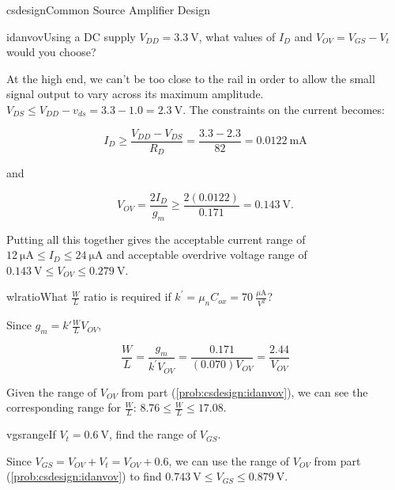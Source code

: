 \begin{mainquestion}{csdesign}{Common Source Amplifier Design}
\begin{partquestion}{idanvov}{Using a DC supply $V_{DD} = \qty{3.3}{\volt}$, what values of $I_{D}$ and $V_{OV} = V_{GS} - V_{t}$ would you choose?}
\begin{answer}
At the high end, we can't be too close to the rail in order to allow the small signal output to vary across its maximum amplitude. $V_{DS} \leq V_{DD} - v_{ds} = 3.3 - 1.0 = \qty{2.3}{\volt}$. The constraints on the current becomes:

\[
I_{D} \geq \frac{V_{DD} - V_{DS}}{R_{D}} = \frac{3.3 - 2.3}{82} = \qty{0.0122}{\milli\ampere}
\]

and

\[
V_{OV} = \frac{2I_{D}}{g_{m}} \geq \frac{2(0.0122)}{0.171} = \qty{0.143}{\volt}.
\]

Putting all this together gives the acceptable current range of $\qty{12}{\micro\ampere} \leq I_{D} \leq \qty{24}{\micro\ampere}$ and acceptable overdrive voltage range of $\qty{0.143}{\volt} \leq V_{OV} \leq \qty{0.279}{\volt}$.
\end{answer}
\end{partquestion}

\begin{partquestion}{wlratio}{What $\frac{W}{L}$ ratio is required if $k^{\prime} = \mu_{n} C_{ox} = 70\ \frac{\mu\text{A}}{V^{2}}$?}
\begin{answer}
Since $g_{m} = k'\frac{W}{L}V_{OV}$,

\[
\frac{W}{L} = \frac{g_{m}}{k^{\prime} V_{OV}} = \frac{0.171}{(0.070)V_{OV}} = \frac{2.44}{V_{OV}}
\]

Given the range of $V_{OV}$ from part (\cref{prob:csdesign:idanvov}), we can see the corresponding range for $\frac{W}{L}$: $8.76 \leq \frac{W}{L} \leq 17.08$.
\end{answer}
\end{partquestion}

\begin{partquestion}{vgsrange}{If $V_{t} = \qty{0.6}{\volt}$, find the range of $V_{GS}$.}
\begin{answer}
Since $V_{GS} = V_{OV} + V_{t} = V_{OV} + 0.6$, we can use the range of $V_{OV}$ from part (\cref{prob:csdesign:idanvov}) to find $\qty{0.743}{\volt} \leq V_{GS} \leq \qty{0.879}{\volt}$.
\end{answer}
\end{partquestion}

\end{mainquestion}

